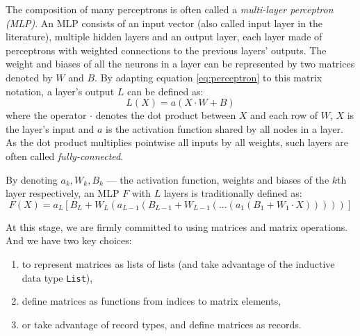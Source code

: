 \documentclass[runningheads]{llncs}
\begin{document}
The composition of many perceptrons is often called a \emph{multi-layer perceptron (MLP)}.
An MLP consists of an input vector (also called input layer in the literature),
multiple hidden layers and an output layer, each layer 
made of perceptrons with weighted connections to the previous layers' outputs. %
The weight and biases of all the neurons in a layer can be represented by two matrices denoted by $W$ and $B$. By adapting equation \ref{eq:perceptron} to this matrix notation, a layer's output $L$ can be defined as:
\begin{equation}
	L(X) = a(X \cdot W + B)
\end{equation}
where the operator $\cdot $ denotes the dot product between $X$ and each row of $W$, %
$X$ is the layer's input and $a$ is the activation function shared by all nodes in a layer. %
As the dot product multiplies pointwise all inputs by all weights, such layers are often called \emph{fully-connected}. %

By denoting $a_k, W_k, B_k$ --- the activation function, weights and biases of the $k$th layer respectively, an MLP $F$ with $L$ layers is traditionally defined as:
\begin{equation}
	F(X) = a_L[B_L + W_L (a_{L-1}(B_{L-1} + W_{L-1}(...(a_1(B_1+W_1\cdot X)))))]
      \end{equation}

      At this stage, we are firmly committed to using matrices and matrix operations. And we have two key choices:
\begin{enumerate}
\item to represent matrices as lists of lists (and take advantage of the inductive data type \lstinline{List}),
  \item define matrices as functions from indices to matrix elements,
     \item  or take advantage of record types, and define matrices as records.  
\end{enumerate}
\end{document}
